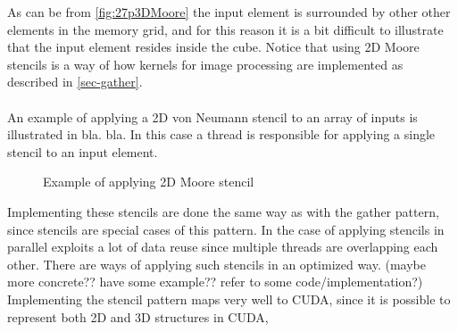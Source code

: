 As can be from \autoref{fig:27p3DMoore} the input element is surrounded by other other elements in the memory grid, and for this reason it is a bit difficult to illustrate that the input element resides inside the cube.
Notice that using 2D Moore stencils is a way of how kernels for image processing are implemented as described in \autoref{sec-gather}.
\\\\
An example of applying a 2D von Neumann stencil to an array of inputs is illustrated in bla. bla.
In this case a thread is responsible for applying a single stencil to an input element.
\begin{figure}[ht]
	\centering
	\caption{Example of applying 2D Moore stencil}
	\label{fig:2dMooreEx}
\end{figure}
Implementing these stencils are done the same way as with the gather pattern, since stencils are special cases of this pattern.
In the case of applying stencils in parallel exploits a lot of data reuse since multiple threads are overlapping each other.
There are ways of applying such stencils in an optimized way. (maybe more concrete?? have some example?? refer to some code/implementation?)
Implementing the stencil pattern maps very well to CUDA, since it is possible to represent both 2D and 3D structures in CUDA,